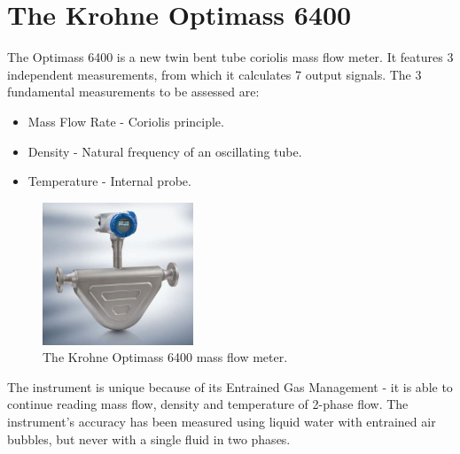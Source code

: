 \documentclass{report}
\begin{document}
\FloatBarrier
\section{The Krohne Optimass 6400}
The Optimass 6400 is a new twin bent tube coriolis mass flow meter. It features 3 independent measurements, from which it calculates 7 output signals. The 3 fundamental measurements to be assessed are:
\begin{itemize}
\item{Mass Flow Rate - Coriolis principle.}
\item{Density - Natural frequency of an oscillating tube.}
\item{Temperature - Internal probe.}
\end{itemize}
\begin{figure}
\includegraphics[width=0.4\textwidth]{Optimass6400}
\caption{The Krohne Optimass 6400 mass flow meter.} %
\label{fig:optimass6400}
\end{figure}
The instrument is unique because of its Entrained Gas Management - it is able to continue reading mass flow, density and temperature of 2-phase flow. \cite{processArticle} The instrument's accuracy has been measured using liquid water with entrained air bubbles, but never with a single fluid in two phases. 
\end{document}

